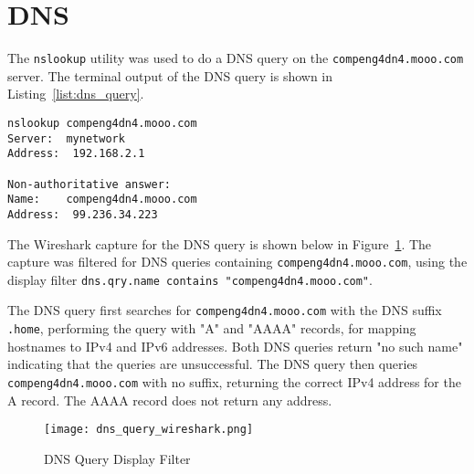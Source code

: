 \section*{DNS}
The \texttt{nslookup} utility was used to do a DNS query on the \texttt{compeng4dn4.mooo.com} server. The terminal output of the DNS query is shown in Listing~\ref{list:dns_query}.

\begin{lstlisting}[caption=DNS Query Terminal Output,label=list:dns_query]
nslookup compeng4dn4.mooo.com
Server:  mynetwork
Address:  192.168.2.1

Non-authoritative answer:
Name:    compeng4dn4.mooo.com
Address:  99.236.34.223
\end{lstlisting}

The Wireshark capture for the DNS query is shown below in Figure~\ref{fig:dns_query}. The capture was filtered for DNS queries containing \texttt{compeng4dn4.mooo.com}, using the display filter \texttt{dns.qry.name contains "compeng4dn4.mooo.com"}. 

The DNS query first searches for \texttt{compeng4dn4.mooo.com} with the DNS suffix \texttt{.home}, performing the query with "A" and "AAAA" records, for mapping hostnames to IPv4 and IPv6 addresses. Both DNS queries return "no such name" indicating that the queries are unsuccessful. The DNS query then queries \texttt{compeng4dn4.mooo.com} with no suffix, returning the correct IPv4 address for the A record. The AAAA record does not return any address.

\begin{figure}[htp]
\centering
\caption[dns_query]{DNS Query Display Filter}\label{fig:dns_query}
\texttt{[image: dns\_query\_wireshark.png]}
\end{figure}